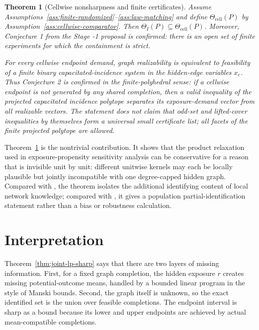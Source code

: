 \documentclass[11pt]{article}
\theoremstyle{definition}
\theoremstyle{plain}
\newtheorem{theorem}{Theorem}
\theoremstyle{remark}
\begin{document}
\begin{theorem}[Cellwise nonsharpness and finite certificates]\label{thm:cellwise-gap}
Assume Assumptions~\ref{ass:finite-randomized}--\ref{ass:law-matching} and
define \(\Theta_{\mathrm{cell}}(P)\) by Assumption~\ref{ass:cellwise-comparator}.
Then \(\Theta_I(P)\subseteq\Theta_{\mathrm{cell}}(P)\).  Moreover, Conjecture 1
from the Stage -1 proposal is confirmed: there is an open set of finite
experiments for which the containment is strict.

For every cellwise endpoint demand, graph realizability is equivalent to
feasibility of a finite binary capacitated-incidence system in the hidden-edge
variables \(x_e\).  Thus Conjecture 2 is confirmed in the finite-polyhedral
sense: if a cellwise endpoint is not generated by any shared completion, then a
valid inequality of the projected capacitated incidence polytope separates its
exposure-demand vector from all realizable vectors.  The statement does not
claim that odd-set and lifted-cover inequalities by themselves form a universal
small certificate list; all facets of the finite projected polytope are allowed.
\end{theorem}

Theorem~\ref{thm:cellwise-gap} is the nontrivial contribution.  It shows that
the product relaxation used in exposure-propensity sensitivity analysis can be
conservative for a reason that is invisible unit by unit: different unitwise
kernels may each be locally plausible but jointly incompatible with one
degree-capped hidden graph.  Compared with \cite{SchroderOprescuFeuerriegelKallus2026},
the theorem isolates the additional identifying content of local network
knowledge; compared with \cite{WeinsteinNevo2026}, it gives a population
partial-identification statement rather than a bias or robustness calculation.

\section{Interpretation}
Theorem~\ref{thm:joint-lp-sharp} says that there are two layers of missing
information.  First, for a fixed graph completion, the hidden exposure \(r\)
creates missing potential-outcome means, handled by a bounded linear program in
the style of Manski bounds.  Second, the graph itself is unknown, so the exact
identified set is the union over feasible completions.  The endpoint interval is
sharp as a bound because its lower and upper endpoints are achieved by actual
mean-compatible completions.
\end{document}
